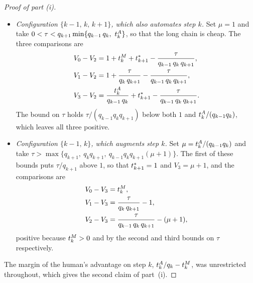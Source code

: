 \begin{proof}[Proof of part (i)]
\begin{itemize}
\item \emph{Configuration $\{k-1,\, k,\, k+1\}$, which also automates step $k$.}
Set $\mu = 1$ and take $0 < \tau < q_{k+1} \min\{q_{k-1}\, q_k,\ t^{A}_{k}\}$, so that the long chain is cheap.
The three comparisons are
\begin{align*}
V_0 - V_2 &= 1 + t^{M}_{k} + t^*_{k+1} - \frac{\tau}{q_{k-1}\, q_k\, q_{k+1}}, \\
V_1 - V_2 &= 1 + \frac{\tau}{q_k\, q_{k+1}} - \frac{\tau}{q_{k-1}\, q_k\, q_{k+1}}, \\
V_3 - V_2 &= \frac{t^{A}_{k}}{q_{k-1}\, q_k} + t^*_{k+1} - \frac{\tau}{q_{k-1}\, q_k\, q_{k+1}}.
\end{align*}
The bound on $\tau$ holds $\tau/(q_{k-1} q_k q_{k+1})$ below both $1$ and $t^{A}_{k}/(q_{k-1} q_k)$, which leaves all three positive.

\item \emph{Configuration $\{k-1,\, k\}$, which augments step $k$.}
Set $\mu = t^{A}_{k}/(q_{k-1} q_k)$ and take $\tau > \max\{q_{k+1},\ q_k q_{k+1},\ q_{k-1} q_k q_{k+1} (\mu+1)\}$.
The first of these bounds puts $\tau/q_{k+1}$ above $1$, so that $t^*_{k+1} = 1$ and $V_3 = \mu + 1$, and the comparisons are
\begin{align*}
V_0 - V_3 &= t^{M}_{k}, \\
V_1 - V_3 &= \frac{\tau}{q_k\, q_{k+1}} - 1, \\
V_2 - V_3 &= \frac{\tau}{q_{k-1}\, q_k\, q_{k+1}} - (\mu + 1),
\end{align*}
positive because $t^{M}_{k} > 0$ and by the second and third bounds on $\tau$ respectively.
\end{itemize}

The margin of the human's advantage on step $k$, $t^{A}_{k}/q_k - t^{M}_{k}$, was unrestricted throughout, which gives the second claim of part~(i).
\end{proof}


